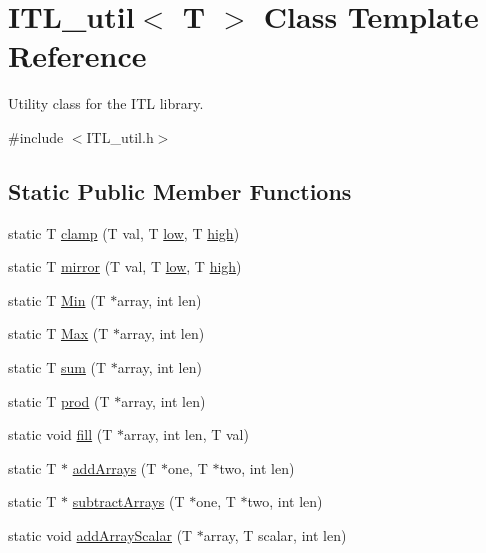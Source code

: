 \hypertarget{classITL__util}{
\section{ITL\_\-util$<$ T $>$ Class Template Reference}
\label{classITL__util}
}


Utility class for the ITL library.  




{\ttfamily \#include $<$ITL\_\-util.h$>$}

\subsection*{Static Public Member Functions}
\begin{DoxyCompactItemize}
\item 
static T \hyperlink{classITL__util_a7d3b943bbe22704d2ac9d62fd8820b90}{clamp} (T val, T \hyperlink{MainIT__regvector_8cpp_abb1e2dad97264e859f3ee8af1341d68c}{low}, T \hyperlink{MainIT__regvector_8cpp_a2012a18ba7a98e566c072356d03c4240}{high})
\item 
static T \hyperlink{classITL__util_af15f3ba814e5e45277141747f9e16133}{mirror} (T val, T \hyperlink{MainIT__regvector_8cpp_abb1e2dad97264e859f3ee8af1341d68c}{low}, T \hyperlink{MainIT__regvector_8cpp_a2012a18ba7a98e566c072356d03c4240}{high})
\item 
static T \hyperlink{classITL__util_a0ae10172a5e09f46ff2d280d1f1d41b0}{Min} (T $\ast$array, int len)
\item 
static T \hyperlink{classITL__util_a162025a233f6ec9ca5bf9218390e8ad3}{Max} (T $\ast$array, int len)
\item 
static T \hyperlink{classITL__util_aad5bdd0ab06d36d4119e05ec2786005b}{sum} (T $\ast$array, int len)
\item 
static T \hyperlink{classITL__util_a9d64af43f6c6d4ebbbb794c6a95c12d6}{prod} (T $\ast$array, int len)
\item 
static void \hyperlink{classITL__util_aa99e2c6682db5444c25bacf428d6d1b9}{fill} (T $\ast$array, int len, T val)
\item 
static T $\ast$ \hyperlink{classITL__util_a8d0970f66d8443b106ec3b2b56008193}{addArrays} (T $\ast$one, T $\ast$two, int len)
\item 
static T $\ast$ \hyperlink{classITL__util_af3fcfd1766bf96813b009adc8abb5a7b}{subtractArrays} (T $\ast$one, T $\ast$two, int len)
\item 
static void \hyperlink{classITL__util_ab67646a3fb9b2749d2f763125ccb1dfa}{addArrayScalar} (T $\ast$array, T scalar, int len)

\end{DoxyCompactItemize}
